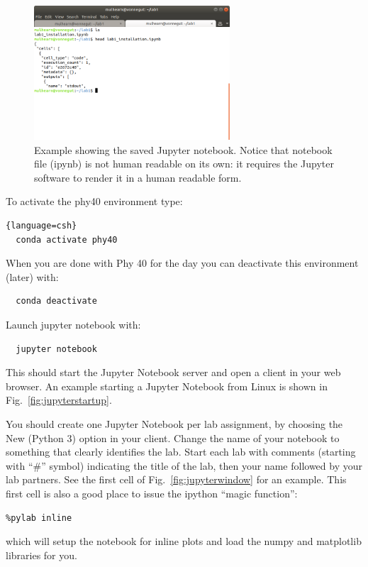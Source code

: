\begin{figure}[htbp]
\begin{center}
\includegraphics[width=0.65\textwidth]{figs/install/jupyter_saved.png} 
\caption{Example showing the saved Jupyter notebook.  Notice that notebook file (ipynb) is not human readable on its own: it requires the Jupyter software to render it in a human readable form.}
\label{fig:jupytersaved}
\end{center}
\end{figure}

To activate the phy40 environment type:
\begin{lstlisting}{language=csh}
  conda activate phy40
\end{lstlisting}
When you are done with Phy 40 for the day you can deactivate this
environment (later) with:
\begin{lstlisting}
  conda deactivate
\end{lstlisting}
Launch jupyter notebook with:
\begin{lstlisting}
  jupyter notebook
\end{lstlisting}
This should start the Jupyter Notebook server and open a client in your web browser.
An example starting a Jupyter Notebook from Linux is shown in Fig.~\ref{fig:jupyterstartup}.

You should create one Jupyter Notebook per lab assignment, by choosing
the New (Python 3) option in your client.  Change the name of your
notebook to something that clearly identifies the lab.  Start each lab
with comments (starting with ``\#'' symbol) indicating the title of
the lab, then your name followed by your lab partners.  See the first
cell of Fig.~\ref{fig:jupyterwindow} for an example.  This first cell
is also a good place to issue the ipython ``magic function'':
\begin{verbatim}
%pylab inline
\end{verbatim}
which will setup the notebook for inline plots and load the numpy and matplotlib libraries for you.

